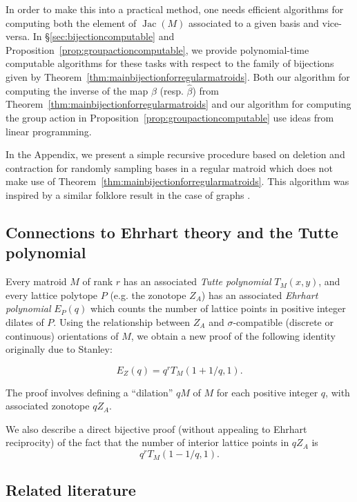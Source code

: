\documentclass[12pt]{amsart}
\numberwithin{equation}{section}
\theoremstyle{definition}
\newcommand{\Jac}{\operatorname{Jac}}
\begin{document}
In order to make this into a practical method, one needs efficient algorithms for computing both the element of $\Jac(M)$ associated to a given basis and vice-versa.  In \S\ref{sec:bijectioncomputable} and Proposition~\ref{prop:groupactioncomputable}, we provide polynomial-time computable algorithms for these tasks with respect to the family of bijections given by Theorem~\ref{thm:mainbijectionforregularmatroids}.
Both our algorithm for computing the inverse of the map $\beta$ (resp. $\hat{\beta}$) from Theorem~\ref{thm:mainbijectionforregularmatroids} and our algorithm for computing the group action in Proposition~\ref{prop:groupactioncomputable} use ideas from linear programming.  

In the Appendix, we present a simple recursive procedure based on deletion and contraction for randomly sampling bases in a regular matroid which does not make use of Theorem~\ref{thm:mainbijectionforregularmatroids}.  This algorithm was inspired by a similar folklore result in the case of graphs \cite{kalaiblog}.

\subsection{Connections to Ehrhart theory and the Tutte polynomial}

Every matroid $M$ of rank $r$ has an associated {\em Tutte polynomial} $T_M(x,y)$, and every lattice polytope $P$ (e.g. the zonotope $Z_A$) has an associated {\em Ehrhart polynomial} $E_P(q)$ which counts the number of lattice points in positive integer dilates of $P$.  Using the relationship between $Z_A$ and $\sigma$-compatible (discrete or continuous) orientations of $M$, we obtain a new proof of the following identity originally due to Stanley:

\begin{equation} \label{eq:stanley}
E_Z(q) = q^r T_{M}(1 + 1/q,1).
\end{equation}

The proof involves defining a ``dilation'' $qM$ of $M$ for each positive integer $q$, with associated zonotope $qZ_A$. 

We also describe a direct bijective proof (without appealing to Ehrhart reciprocity) of the fact that the number of interior lattice points in $qZ_A$ is 
\[
q^r T_{M}(1-1/q,1).
\]



\subsection{Related literature}
\end{document}
